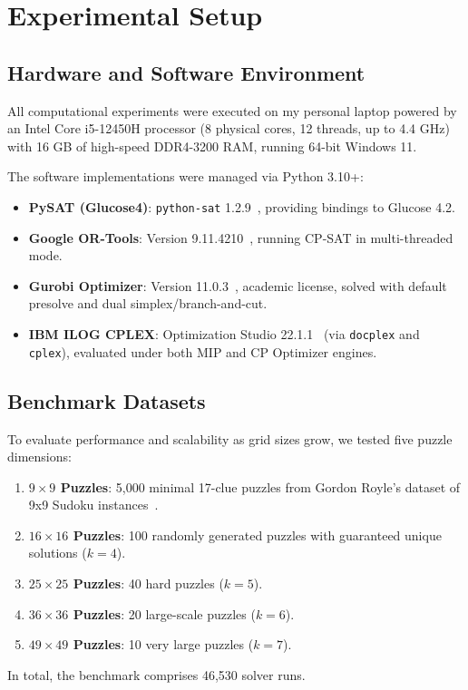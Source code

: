 \documentclass[a4paper,fleqn]{cas-sc}
\begin{document}
\section{Experimental Setup}
\label{sec:setup}

\subsection{Hardware and Software Environment}
All computational experiments were executed on my personal laptop powered by an Intel Core i5-12450H processor (8 physical cores, 12 threads, up to 4.4 GHz) with 16 GB of high-speed DDR4-3200 RAM, running 64-bit Windows 11. 

The software implementations were managed via Python 3.10+:
\begin{itemize}
    \item \textbf{PySAT (Glucose4)}: \texttt{python-sat} 1.2.9~\cite{ignatiev2018pysat}, providing bindings to Glucose 4.2.
    \item \textbf{Google OR-Tools}: Version 9.11.4210~\cite{ortools}, running CP-SAT in multi-threaded mode.
    \item \textbf{Gurobi Optimizer}: Version 11.0.3~\cite{gurobi2024}, academic license, solved with default presolve and dual simplex/branch-and-cut.
    \item \textbf{IBM ILOG CPLEX}: Optimization Studio 22.1.1~\cite{cplex2022} (via \texttt{docplex} and \texttt{cplex}), evaluated under both MIP and CP Optimizer engines.
\end{itemize}

\subsection{Benchmark Datasets}
To evaluate performance and scalability as grid sizes grow, we tested five puzzle dimensions:
\begin{enumerate}
    \item \textbf{$9 \times 9$ Puzzles}: 5,000 minimal 17-clue puzzles from Gordon Royle's dataset of 9x9 Sudoku instances~\cite{royle2014minimum}.
    \item \textbf{$16 \times 16$ Puzzles}: 100 randomly generated puzzles with guaranteed unique solutions ($k = 4$).
    \item \textbf{$25 \times 25$ Puzzles}: 40 hard puzzles ($k = 5$).
    \item \textbf{$36 \times 36$ Puzzles}: 20 large-scale puzzles ($k = 6$).
    \item \textbf{$49 \times 49$ Puzzles}: 10 very large puzzles ($k = 7$).
\end{enumerate}
In total, the benchmark comprises 46,530 solver runs.
\end{document}
